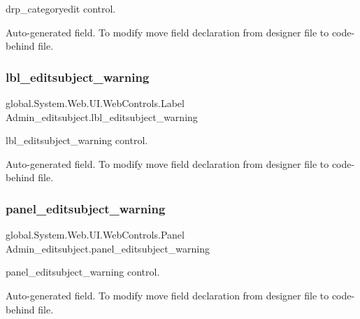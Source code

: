 drp\+\_\+categoryedit control. 

Auto-\/generated field. To modify move field declaration from designer file to code-\/behind file. \mbox{\label{class_admin__editsubject_a5916528089fba4db5b376d683d3ad94c}} 
\subsubsection{\texorpdfstring{lbl\_editsubject\_warning}{lbl\_editsubject\_warning}}
{\footnotesize\ttfamily global.\+System.\+Web.\+U\+I.\+Web\+Controls.\+Label Admin\+\_\+editsubject.\+lbl\+\_\+editsubject\+\_\+warning\hspace{0.3cm}{\ttfamily [protected]}}



lbl\+\_\+editsubject\+\_\+warning control. 

Auto-\/generated field. To modify move field declaration from designer file to code-\/behind file. \mbox{\label{class_admin__editsubject_a18b2679a242158de4a729520ab49e17c}} 
\subsubsection{\texorpdfstring{panel\_editsubject\_warning}{panel\_editsubject\_warning}}
{\footnotesize\ttfamily global.\+System.\+Web.\+U\+I.\+Web\+Controls.\+Panel Admin\+\_\+editsubject.\+panel\+\_\+editsubject\+\_\+warning\hspace{0.3cm}{\ttfamily [protected]}}



panel\+\_\+editsubject\+\_\+warning control. 

Auto-\/generated field. To modify move field declaration from designer file to code-\/behind file. \mbox{\label{class_admin__editsubject_ac0e8b53b23e0729fe4b9ee3811d47ca6}} 
